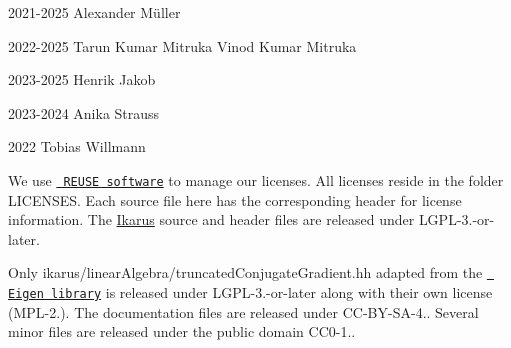
\begin{DoxyItemize}
\item 2021-\/2025 Alexander Müller
\item 2022-\/2025 Tarun Kumar Mitruka Vinod Kumar Mitruka
\item 2023-\/2025 Henrik Jakob
\item 2023-\/2024 Anika Strauss
\item 2022 Tobias Willmann
\end{DoxyItemize}

We use \href{https://reuse.software/}{\texttt{ REUSE software}} to manage our licenses. All licenses reside in the folder {\ttfamily LICENSES}. Each source file here has the corresponding header for license information. The \mbox{\hyperlink{a00396}{Ikarus}} source and header files are released under {\ttfamily LGPL-\/3.-\/or-\/later}.

Only {\ttfamily ikarus/linear\+Algebra/truncated\+Conjugate\+Gradient.\+hh} adapted from the \href{https://eigen.tuxfamily.org/index.php?title=Main_Page}{\texttt{ Eigen library}} is released under {\ttfamily LGPL-\/3.-\/or-\/later} along with their own license ({\ttfamily MPL-\/2.}). The documentation files are released under {\ttfamily CC-\/\+BY-\/\+SA-\/4.}. Several minor files are released under the public domain {\ttfamily CC0-\/1.}. 